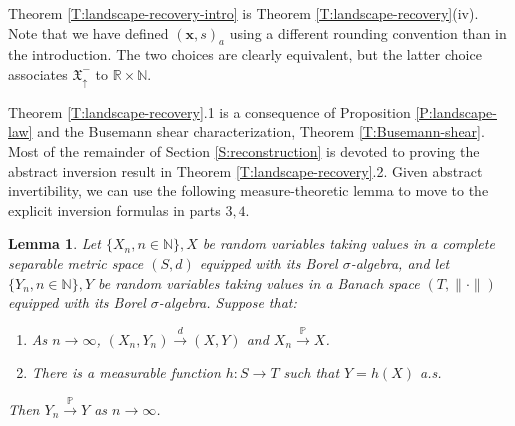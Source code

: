 \documentclass[11pt]{article}
\newcommand{\N}{\mathbb{N}}
\newcommand{\R}{\mathbb{R}}
\newcommand{\sig}{\sigma}
\newcommand{\cvgd}{\stackrel{d}{\to}}
\newcommand{\cvgp}{\stackrel{\mathbb{P}}{\to}}
\newcommand{\X}{\times}
\newcommand{\bx}{\mathbf{x}}
\newtheorem{lemma}[theorem]{Lemma}
\theoremstyle{definition} %
\theoremstyle{remark} %
\begin{document}
Theorem \ref{T:landscape-recovery-intro} is Theorem \ref{T:landscape-recovery}(iv). Note that we have defined $(\bx, s)_a$ using a different rounding convention than in the introduction. The two choices are clearly equivalent, but the latter choice associates $\mathfrak{X}^-_\uparrow$ to $\R \X \N$.

Theorem \ref{T:landscape-recovery}.1 is a consequence of Proposition \ref{P:landscape-law} and the Busemann shear characterization, Theorem \ref{T:Busemann-shear}. Most of the remainder of Section \ref{S:reconstruction} is devoted to proving the abstract inversion result in Theorem \ref{T:landscape-recovery}.2. Given abstract invertibility, we can use the following measure-theoretic lemma to move to the explicit inversion formulas in parts $3, 4$.

\begin{lemma}
	\label{L:measure-theory-lemma-b}
	Let $\{X_n, n \in \N\}, X$ be random variables taking values in a complete separable metric space $(S, d)$ equipped with its Borel $\sig$-algebra, and let $\{Y_n, n \in \N\}, Y$ be random variables taking values in a Banach space $(T, \|\cdot\|)$ equipped with its Borel $\sig$-algebra.
	Suppose that:
	\begin{enumerate}
		\item As $n \to \infty$, $(X_n, Y_n) \cvgd (X, Y)$ and $X_n \cvgp X$.
		\item There is a measurable function $h:S \to T$ such that $Y = h(X)$ a.s.
	\end{enumerate}
	Then $Y_n \cvgp Y$ as $n \to \infty$.
\end{lemma}
\end{document}
